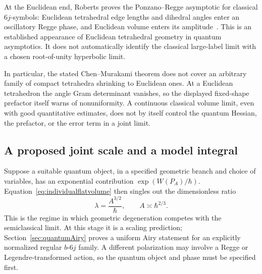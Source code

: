 At the Euclidean end, Roberts proves the Ponzano--Regge asymptotic
for classical $6j$-symbols: Euclidean tetrahedral edge lengths and
dihedral angles enter an oscillatory Regge phase, and Euclidean
volume enters its amplitude~\cite{Roberts}. This is an established
appearance of Euclidean tetrahedral geometry in quantum
asymptotics. It does not automatically identify the classical
large-label limit with a chosen root-of-unity hyperbolic limit.

In particular, the stated Chen--Murakami theorem does not cover
an arbitrary family of compact tetrahedra shrinking to Euclidean
ones. At a Euclidean tetrahedron the angle Gram determinant
vanishes, so the displayed fixed-shape prefactor itself warns of
nonuniformity. A continuous classical volume limit, even with
good quantitative estimates, does not by itself control the
quantum Hessian, the prefactor, or the error term in a joint limit.

\subsection{A proposed joint scale and a model integral}

Suppose a suitable quantum object, in a specified geometric branch
and choice of variables, has an exponential contribution
$\exp(W(P_A)/\hbar)$. Equation~\eqref{eq:individualflatvolume}
then singles out the dimensionless ratio
\begin{equation}
 \lambda=\frac{A^{3/2}}{\hbar},\qquad
 A\asymp\hbar^{2/3}.
 \label{eq:jointscale}
\end{equation}
This is the regime in which geometric degeneration competes
with the semiclassical limit. At this stage it is a scaling prediction;
Section~\ref{sec:quantumAiry} proves a uniform Airy statement for an
explicitly normalized regular $b$-$6j$ family. A different
polarization may involve a Regge or Legendre-transformed action,
so the quantum object and phase must be specified first.

